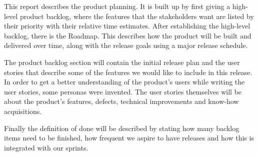 This report describes the product planning. It is built up by first giving a high-level product backlog, where the features that the stakeholders want are listed by their priority with their relative time estimates. After establishing the high-level backlog, there is the Roadmap. This describes how the product will be built and delivered over time, along with the release goals using a major release schedule. 

The product backlog section will contain the initial release plan and the user stories that describe some of the features we would like to include in this release. In order to get a better understanding of the product's users while writing the user stories, some personas were invented. The user stories themselves will be about the product's features, defects, technical improvements and know-how acquisitions.

Finally the definition of done will be described by stating how many backlog items need to be finished, how frequent we aspire to have releases and how this is integrated with our sprints.

